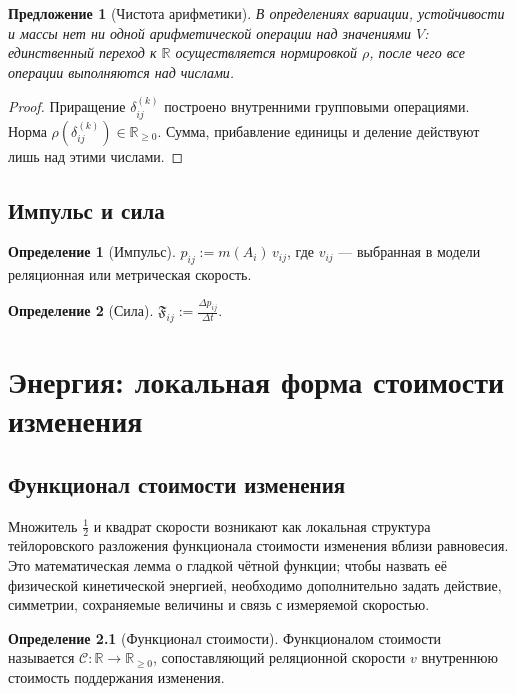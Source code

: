\documentclass[12pt,a4paper,oneside]{book}
\theoremstyle{definition}
\newtheorem{definition}{Определение}[chapter]
\theoremstyle{plain}
\newtheorem{proposition}{Предложение}[chapter]
\theoremstyle{remark}
\newcommand{\Values}{V}
\newcommand{\norm}{\rho}
\newcommand{\Cost}{\mathcal C}
\begin{document}
\begin{proposition}[Чистота арифметики]
В определениях вариации, устойчивости и массы нет ни одной арифметической операции над
значениями $\Values$: единственный переход к $\mathbb R$ осуществляется нормировкой
$\norm$, после чего все операции выполняются над числами.
\end{proposition}

\begin{proof}
Приращение $\delta_{ij}^{(k)}$ построено внутренними групповыми операциями. Норма
$\norm(\delta_{ij}^{(k)})\in\mathbb R_{\ge0}$. Сумма, прибавление единицы и деление
действуют лишь над этими числами.
\end{proof}

\section{Импульс и сила}

\begin{definition}[Импульс]
$p_{ij}:=m(A_i)\,v_{ij}$,
где $v_{ij}$ --- выбранная в модели реляционная или метрическая скорость.
\end{definition}

\begin{definition}[Сила]
$\displaystyle\mathfrak F_{ij}:=\frac{\Delta p_{ij}}{\Delta t}$.
\end{definition}

\chapter{Энергия: локальная форма стоимости изменения}

\section{Функционал стоимости изменения}

Множитель $\tfrac12$ и квадрат скорости возникают как локальная структура
тейлоровского разложения функционала стоимости изменения вблизи равновесия. Это
математическая лемма о гладкой чётной функции; чтобы назвать её физической
кинетической энергией, необходимо дополнительно задать действие, симметрии,
сохраняемые величины и связь с измеряемой скоростью.

\begin{definition}[Функционал стоимости]
Функционалом стоимости называется $\Cost:\mathbb R\to\mathbb R_{\ge0}$,
сопоставляющий реляционной скорости $v$ внутреннюю стоимость поддержания изменения.
\end{definition}
\end{document}
